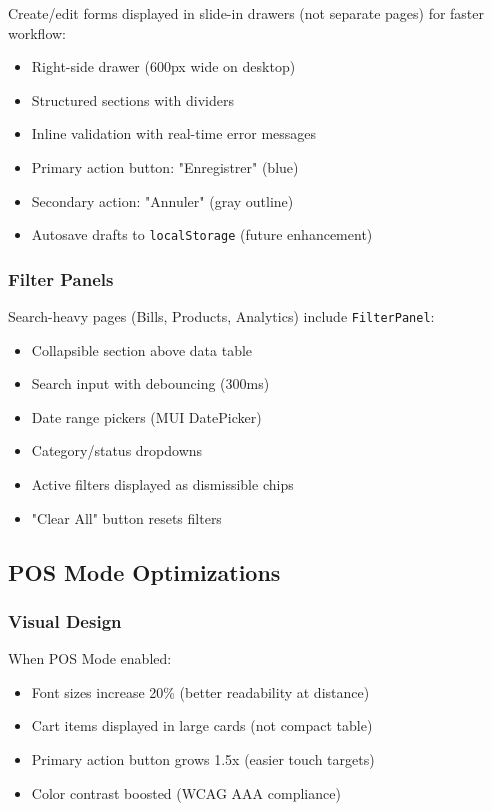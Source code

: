 Create/edit forms displayed in slide-in drawers (not separate pages) for faster workflow:

\begin{itemize}
    \item Right-side drawer (600px wide on desktop)
    \item Structured sections with dividers
    \item Inline validation with real-time error messages
    \item Primary action button: "Enregistrer" (blue)
    \item Secondary action: "Annuler" (gray outline)
    \item Autosave drafts to \texttt{localStorage} (future enhancement)
\end{itemize}

\subsubsection{Filter Panels}

Search-heavy pages (Bills, Products, Analytics) include \texttt{FilterPanel}:

\begin{itemize}
    \item Collapsible section above data table
    \item Search input with debouncing (300ms)
    \item Date range pickers (MUI DatePicker)
    \item Category/status dropdowns
    \item Active filters displayed as dismissible chips
    \item "Clear All" button resets filters
\end{itemize}

\subsection{POS Mode Optimizations}

\subsubsection{Visual Design}

When POS Mode enabled:

\begin{itemize}
    \item Font sizes increase 20\% (better readability at distance)
    \item Cart items displayed in large cards (not compact table)
    \item Primary action button grows 1.5x (easier touch targets)
    \item Color contrast boosted (WCAG AAA compliance)
\end{itemize}

